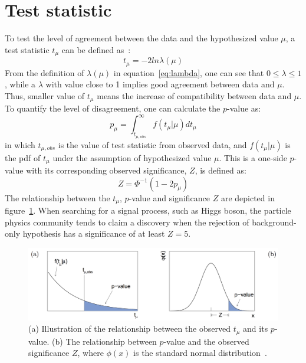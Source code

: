 \section{Test statistic}
\label{sec:teststat}

To test the level of agreement between the data and the hypothesized value $\mu$, a test statistic $t_{\mu}$ can be defined as~\cite{Cowan:2010js}:
\begin{equation}
    t_{\mu} = -2 ln \lambda (\mu)
\end{equation}
From the definition of $\lambda(\mu)$ in equation~\ref{eq:lambda}, one can see that $0 \le \lambda \le 1$,
while a $\lambda$ with value close to 1 implies good agreement between data and $\mu$.
Thus, smaller value of $t_{\mu}$ means the increase of compatibility between data and $\mu$.
To quantify the level of disagreement, one can calculate the $p$-value as:
\begin{equation}
    p_{\mu} = \int_{t_{\mu, obs}}^{\infty} f(t_{\mu}|\mu) d t_{\mu}
\end{equation}
in which $t_{\mu, obs}$ is the value of test statistic from observed data, 
and $f(t_{\mu}|\mu)$ is the pdf of $t_{\mu}$ under the assumption of hypothesized value $\mu$.
This is a one-side $p$-value with its corresponding observed significance, $Z$, is defined as:
\begin{equation}
    Z = \Phi^{-1}(1-2p_{\mu})
\end{equation}
The relationship between the $t_{\mu}$, $p$-value and significance $Z$ are depicted in figure~\ref{fig:pvalue_Z}.
When searching for a signal process, such as Higgs boson, the particle physics community tends to claim a discovery
when the rejection of background-only hypothesis has a significance of at least $Z = 5$.

\begin{figure}[!htbp]
\begin{center}
\includegraphics[width=1.0\textwidth]{figures/Statistic/test_statistic_pvalue_Z.png}
\end{center}
\caption{(a) Illustration of the relationship between the observed $t_{\mu}$ and its $p$-value. 
         (b) The relationship between $p$-value and the observed significance $Z$, where $\phi(x)$ is the standard normal distribution~\cite{Cowan:2010js}.}
\label{fig:pvalue_Z}
\end{figure}

